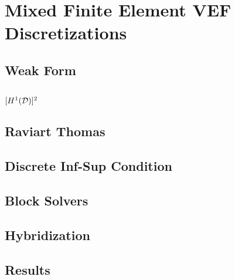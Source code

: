 \documentclass[../doc.tex]{subfiles}
\begin{document}
\chapter{Mixed Finite Element VEF Discretizations}

\section{Weak Form}
\section{$[H^1(\mathcal{D})]^2$}
\section{Raviart Thomas}
\section{Discrete Inf-Sup Condition}
\section{Block Solvers}
\section{Hybridization}
\section{Results}

\begin{table}
\centering
\caption{}
\label{}

\end{table}

\begin{table}
\centering
\caption{}
\label{}

\end{table}

\begin{table}
\centering
\caption{}
\label{}

\end{table}


\begin{table}
\centering
\caption{}
\label{}

\end{table}

\begin{table}
\centering
\caption{}
\label{}

\end{table}

\begin{table}
\centering
\caption{}
\label{}
\begin{adjustbox}{max width=\textwidth}

\end{adjustbox}
\end{table}

\begin{table}
\centering
\caption{}
\label{}

\end{table}
\end{document}
